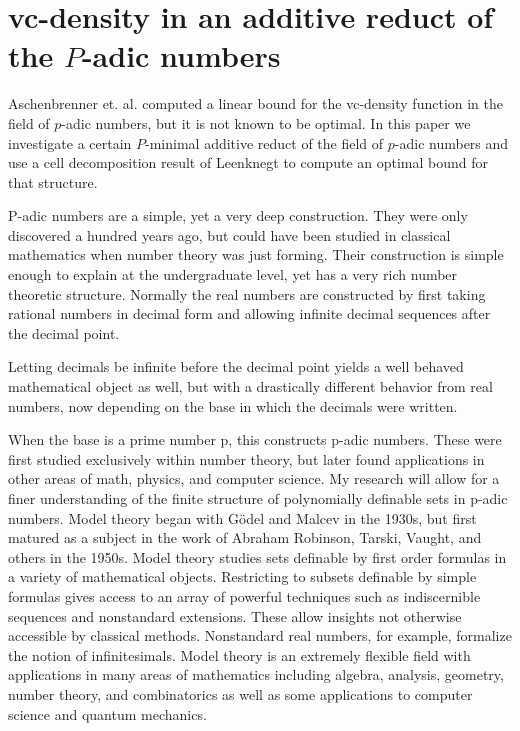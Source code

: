  
\chapter{vc-density in an additive reduct of the $P$-adic numbers}

  Aschenbrenner et. al. computed a linear bound for the vc-density function in the field of $p$-adic numbers,
  but it is not known to be optimal.
  In this paper we investigate a certain $P$-minimal additive reduct of the field of $p$-adic numbers and
  use a cell decomposition result of Leenknegt to compute an optimal bound for that structure.


P-adic numbers are a simple, yet a very deep construction.
They were only discovered a hundred years ago, but could have been studied in classical mathematics when number theory was just forming.
Their construction is simple enough to explain at the undergraduate level, yet has a very rich number theoretic structure.
Normally the real numbers are constructed by first taking rational numbers in decimal form and allowing infinite decimal sequences after the decimal point.

Letting decimals be infinite before the decimal point yields a well behaved mathematical object as well, but with a drastically different behavior from real numbers, now depending on the base in which the decimals were written.

When the base is a prime number p, this constructs p-adic numbers.
These were first studied exclusively within number theory, but later found applications in other areas of math, physics, and computer science.
My research will allow for a finer understanding of the finite structure of polynomially definable sets in p-adic numbers.
Model theory began with G\"odel and Malcev in the 1930s, but first matured as a subject in the work of Abraham Robinson, Tarski, Vaught, and others in the 1950s.
Model theory studies sets definable by first order formulas in a variety of mathematical objects.
Restricting to subsets definable by simple formulas gives access to an array of powerful techniques such as indiscernible sequences and nonstandard extensions.
These allow insights not otherwise accessible by classical methods.
Nonstandard real numbers, for example, formalize the notion of infinitesimals.
Model theory is an extremely flexible field with applications in many areas of mathematics including algebra, analysis, geometry, number theory, and combinatorics as well as some applications to computer science and quantum mechanics.

